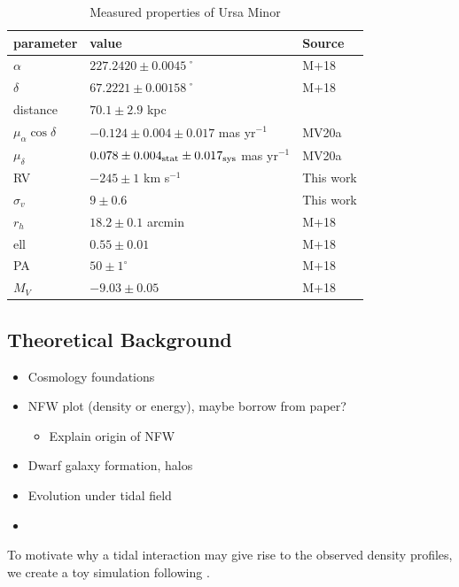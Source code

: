 \begin{table}[t]
\centering
\caption{Measured properties of Ursa Minor}
\label{tbl:Measured-properties-of-Ursa-Minor}
\begin{tabular}{lll}
\toprule
parameter & value & Source\\
\midrule
$\alpha$ & $ 227.2420 \pm 0.0045$˚ & M+18\\
$\delta$ & $67.2221 \pm 0.00158$˚ & M+18\\
distance & $70.1 \pm 2.9$ kpc & \\
$\mu_\alpha \cos \delta$ & $-0.124 \pm 0.004 \pm 0.017$ mas yr$^{-1}$ & MV20a\\
$\mu_\delta$ & $0.078 \pm 0.004_{\rm stat} \pm 0.017_{\rm sys}$ mas yr$^{-1}$ & MV20a\\
RV & $-245 \pm 1$ km s$^{-1}$ & This work\\
$\sigma_v$ & $9 \pm 0.6$ & This work\\
$r_h$ & $18.2 \pm 0.1$ arcmin & M+18\\
ell & $0.55 \pm 0.01$ & M+18\\
PA & $50 \pm 1^\circ$ & M+18\\
$M_V$ & $-9.03 \pm 0.05$ & M+18\\
\bottomrule
\end{tabular}
\end{table}

\subsection{Theoretical Background}\label{theoretical-background}

\begin{itemize}
\tightlist
\item
  Cosmology foundations
\item
  NFW plot (density or energy), maybe borrow from paper?

  \begin{itemize}
  \tightlist
  \item
    Explain origin of NFW
  \end{itemize}
\item
  Dwarf galaxy formation, halos
\item
  Evolution under tidal field
\item
\end{itemize}

To motivate why a tidal interaction may give rise to the observed
density profiles, we create a toy simulation following \citet{PNM2008}.


